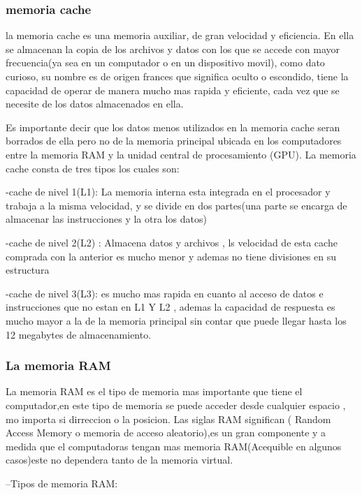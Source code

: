 \documentclass{article}
\begin{document}
        \subsubsection{memoria cache}
        la memoria cache es una memoria auxiliar, de gran velocidad y eficiencia. En ella se almacenan la copia de los archivos y datos con los que se accede con mayor frecuencia(ya sea en un computador o en un dispositivo movil),
        como dato curioso, su nombre es de origen frances que significa oculto o escondido, tiene la capacidad de operar de manera mucho mas rapida y eficiente, cada vez que se necesite de los datos almacenados en ella.\cite{academia1}
        
        Es importante decir que los datos menos utilizados en la memoria cache seran borrados de ella pero no de la memoria principal
        ubicada en los computadores entre la memoria RAM y la unidad central de procesamiento (GPU).
        La memoria cache consta de tres tipos los cuales son:
            
            -cache de nivel 1(L1): La memoria interna  esta integrada en el procesador y trabaja a la misma velocidad, y se divide en dos partes(una parte se encarga de almacenar las instrucciones y la otra los datos)
            
            -cache de nivel 2(L2) : Almacena datos y archivos , ls velocidad de esta cache comprada con la anterior es mucho menor y ademas no tiene divisiones en su estructura
            
            -cache de nivel 3(L3): es mucho mas rapida en cuanto al acceso de datos e instrucciones que no estan en L1 Y L2 , ademas la capacidad de respuesta es mucho mayor a la de la memoria principal sin contar que puede llegar hasta los 12 megabytes de almacenamiento.
        
        \subsubsection{La memoria RAM}
        La memoria RAM es el tipo de memoria mas importante que tiene el computador,en este tipo de memoria se puede acceder desde cualquier espacio , mo importa si dirreccion o la posicion. Las siglas RAM significan ( Random Access Memory o memoria de acceso aleatorio),es un gran componente y a medida que el computadoras tengan mas memoria RAM(Acequible en algunos casos)este no dependera tanto de la memoria virtual.
        
        --Tipos de memoria RAM:
            
\end{document}
